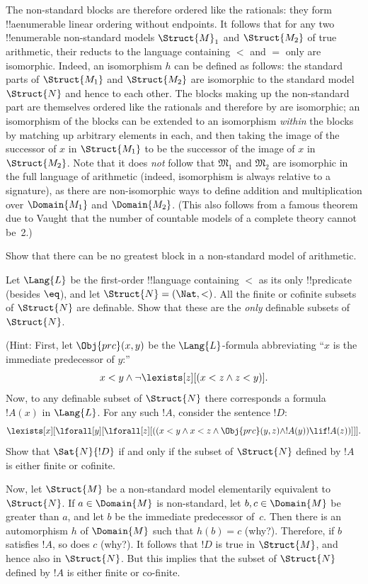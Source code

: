\documentclass[../../../include/open-logic-section]{subfiles}
\begin{document}
The non-standard blocks are therefore ordered like the rationals: they
form !!a{enumerable} linear ordering without endpoints.  It follows
that for any two !!{enumerable} non-standard models $\Struct{M}_1$ and
$\Struct{M_2}$ of true arithmetic, their reducts to the language
containing $<$ and $=$ only are isomorphic. Indeed, an isomorphism $h$
can be defined as follows: the standard parts of $\Struct{M_1}$ and
$\Struct{M_2}$ are isomorphic to the standard model $\Struct{N}$ and
hence to each other. The blocks making up the non-standard part are
themselves ordered like the rationals and therefore by
 are isomorphic; an isomorphism of the blocks
can be extended to an isomorphism \emph{within} the blocks by matching
up arbitrary elements in each, and then taking the image of the
successor of $x$ in $\Struct{M_1}$ to be the successor of the image of
$x$ in $\Struct{M_2}$. Note that it does \emph{not} follow that
$\mathfrak{M}_1$ and $\mathfrak{M}_2$ are isomorphic in the full
language of arithmetic (indeed, isomorphism is always relative to a
signature), as there are non-isomorphic ways to define addition and
multiplication over $\Domain{M_1}$ and $\Domain{M_2}$. (This also
follows from a famous theorem due to Vaught that the number of
countable models of a complete theory cannot be~2.)

\begin{prob}
Show that there can be no greatest block in a non-standard model of
arithmetic.
\end{prob}

\begin{prob} 
Let $\Lang{L}$ be the first-order !!{language} containing $<$ as its
only !!{predicate} (besides $\eq$), and let $\Struct{N} = (\Nat,
<)$. All the finite or cofinite subsets of $\Struct{N}$ are
definable. Show that these are the \emph{only} definable subsets of
$\Struct{N}$.
 
(Hint: First, let $\Obj{prc}(x,y)$ be the
$\Lang{L}$-formula abbreviating ``$x$ is the immediate predecessor
of $y$:''
\[
x<y \land \lnot \lexists[z][(x<z \land z < y)].
\]
Now, to any definable subset of $\Struct{N}$ there corresponds a
formula $!A(x)$ in $\Lang{L}$. For any such $!A$,
consider the sentence $!D$:
\[
\lexists[x][\lforall[y][\lforall[z][((x<y \land x<z \land \Obj{prc}(y,z)
  \land !A(y)) \lif !A(z))]]].
\]
Show that $\Sat{N}{!D}$ if and only if the subset of
$\Struct{N}$ defined by $!A$ is either finite or cofinite.

Now, let $\Struct{M}$ be a non-standard model elementarily
equivalent to $\Struct{N}$.  If $a \in \Domain{M}$ is
non-standard, let $b, c \in \Domain{M}$ be greater than $a$, and
let $b$ be the immediate predecessor of~$c$. Then there is an
automorphism $h$ of $\Domain{M}$ such that $h(b)=c$
(why?). Therefore, if $b$ satisfies $!A$, so does $c$ (why?). It
follows that $!D$ is true in $\Struct{M}$, and hence also in
$\Struct{N}$. But this implies that the subset of $\Struct{N}$
defined by $!A$ is either finite or co-finite.
\end{prob}
\end{document}
